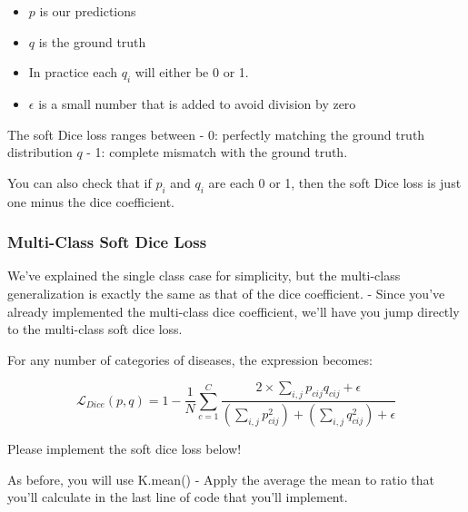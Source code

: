\documentclass[11pt]{article}
\providecommand{\tightlist}{%
      \setlength{\itemsep}{0pt}\setlength{\parskip}{0pt}}
\begin{document}
\begin{itemize}
\tightlist
\item
  \(p\) is our predictions
\item
  \(q\) is the ground truth
\item
  In practice each \(q_i\) will either be 0 or 1.
\item
  \(\epsilon\) is a small number that is added to avoid division by zero
\end{itemize}

The soft Dice loss ranges between - 0: perfectly matching the ground
truth distribution \(q\) - 1: complete mismatch with the ground truth.

You can also check that if \(p_i\) and \(q_i\) are each 0 or 1, then the
soft Dice loss is just one minus the dice coefficient.

\hypertarget{multi-class-soft-dice-loss}{%
\subsubsection{Multi-Class Soft Dice
Loss}\label{multi-class-soft-dice-loss}}

We've explained the single class case for simplicity, but the
multi-class generalization is exactly the same as that of the dice
coefficient. - Since you've already implemented the multi-class dice
coefficient, we'll have you jump directly to the multi-class soft dice
loss.

For any number of categories of diseases, the expression becomes:

\[\mathcal{L}_{Dice}(p, q) = 1 - \frac{1}{N} \sum_{c=1}^{C} \frac{2\times\sum_{i, j} p_{cij}q_{cij} + \epsilon}{\left(\sum_{i, j} p_{cij}^2 \right) + \left(\sum_{i, j} q_{cij}^2 \right) + \epsilon}\]

Please implement the soft dice loss below!

As before, you will use K.mean() - Apply the average the mean to ratio
that you'll calculate in the last line of code that you'll implement.
\end{document}
